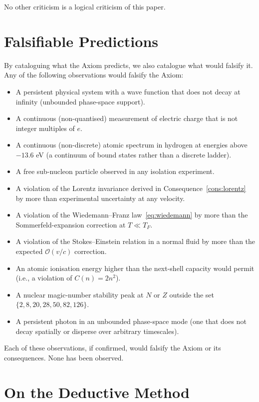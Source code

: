 \documentclass[11pt,twocolumn,a4paper]{article}
\theoremstyle{axiomstyle}
\theoremstyle{conseqstyle}
\theoremstyle{definition}
\theoremstyle{remark}
\begin{document}
No other criticism is a logical criticism of this paper.

\section{Falsifiable Predictions}
\label{sec:predictions}

By cataloguing what the Axiom predicts, we also catalogue what would falsify it. Any of the following observations would falsify the Axiom:

\begin{itemize}[leftmargin=2em]
\item A persistent physical system with a wave function that does not decay at infinity (unbounded phase-space support).
\item A continuous (non-quantised) measurement of electric charge that is not integer multiples of $e$.
\item A continuous (non-discrete) atomic spectrum in hydrogen at energies above $-13.6$ eV (a continuum of bound states rather than a discrete ladder).
\item A free sub-nucleon particle observed in any isolation experiment.
\item A violation of the Lorentz invariance derived in Consequence~\ref{cons:lorentz} by more than experimental uncertainty at any velocity.
\item A violation of the Wiedemann--Franz law~\eqref{eq:wiedemann} by more than the Sommerfeld-expansion correction at $T\ll T_{F}$.
\item A violation of the Stokes--Einstein relation in a normal fluid by more than the expected $\mathcal{O}(v/c)$ correction.
\item An atomic ionisation energy higher than the next-shell capacity would permit (i.e., a violation of $C(n)=2n^{2}$).
\item A nuclear magic-number stability peak at $N$ or $Z$ outside the set $\{2,8,20,28,50,82,126\}$.
\item A persistent photon in an unbounded phase-space mode (one that does not decay spatially or disperse over arbitrary timescales).
\end{itemize}

Each of these observations, if confirmed, would falsify the Axiom or its consequences. None has been observed.

\section{On the Deductive Method}
\label{sec:method}
\end{document}
